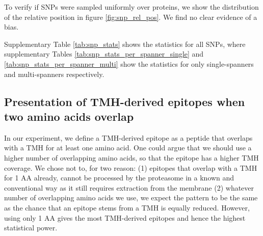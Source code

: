 
To verify if SNPs were sampled uniformly
over proteins, we show the distribution 
of the relative position in figure \ref{fig:snp_rel_pos}.
We find no clear evidence of a bias.


Supplementary Table \ref{tab:snp_stats} shows the statistics for all
SNPs, where supplementary Tables \ref{tab:snp_stats_per_spanner_single}
and \ref{tab:snp_stats_per_spanner_multi} show the
statistics for only single-spanners and multi-spanners respectively.
 






\clearpage

\subsection{Presentation of TMH-derived epitopes when two amino acids overlap}

In our experiment, we define a TMH-derived epitope as a peptide that overlaps
with a TMH for at least one amino acid. 
One could argue that we should use a higher number of overlapping amino acids, so that the epitope has a higher TMH coverage.
We chose not to, for two reason: (1) epitopes that overlap
with a TMH for 1 AA already, cannot be processed by the proteasome in a known and conventional way as it still requires extraction from the membrane
(2) whatever number of overlapping amino acids we use, we expect the pattern to be the same as the chance that an epitope stems from a TMH is equally reduced.
However, using only 1 AA gives the most TMH-derived epitopes and hence the highest statistical
power.

